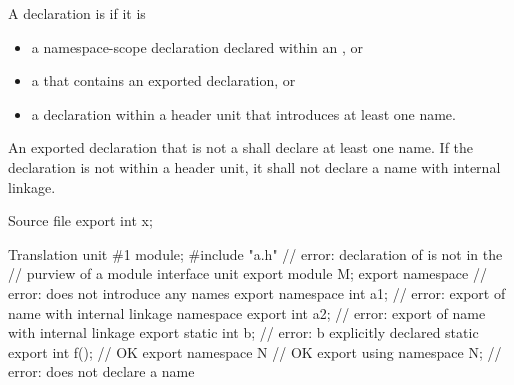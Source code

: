 \pnum
A declaration is  if it is
\begin{itemize}
\item a namespace-scope declaration declared within an
      , or
\item a  that contains an
      exported declaration, or
\item a declaration within a header unit
      that introduces at least one name.
\end{itemize}

\pnum
An exported declaration
that is not a 
shall declare at least one name.
If the declaration is not within a header unit,
it shall not declare a name with internal linkage.

\pnum
\begin{example}
\begin{codeblocktu}{Source file }
export int x;
\end{codeblocktu}

\begin{codeblocktu}{Translation unit \#1}
module;
#include "a.h"                  // error: declaration of  is not in the
                                // purview of a module interface unit
export module M;
export namespace {}             // error: does not introduce any names
export namespace {
  int a1;                       // error: export of name with internal linkage
}
namespace {
  export int a2;                // error: export of name with internal linkage
}
export static int b;            // error: b explicitly declared static
export int f();                 // OK
export namespace N { }          // OK
export using namespace N;       // error: does not declare a name
\end{codeblocktu}
\end{example}

